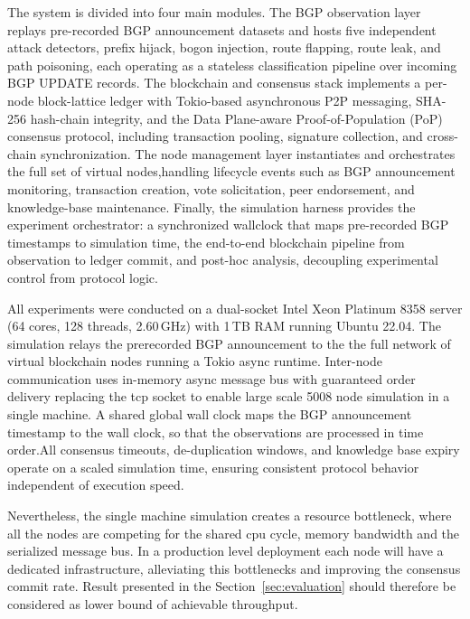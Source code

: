 \documentclass[conference]{IEEEtran}
\newcommand{\BfPara}[1]{\vspace{1mm}{\noindent\textbf{#1.}}\xspace}
\begin{document}
\BfPara{Prototype Architecture}
The system is divided into four main modules. The BGP observation layer replays pre-recorded BGP announcement datasets and hosts five independent attack detectors, prefix
hijack, bogon injection, route flapping, route leak, and path poisoning, each operating as a stateless classification pipeline over incoming BGP UPDATE records. The blockchain and consensus stack implements a per-node block-lattice ledger with Tokio-based asynchronous P2P messaging, SHA-256 hash-chain
integrity, and the Data Plane-aware Proof-of-Population (PoP) consensus protocol, including transaction pooling, signature collection, and cross-chain synchronization. The node management layer instantiates and orchestrates the full set of virtual nodes,handling lifecycle events such as BGP announcement monitoring, transaction creation, vote solicitation, peer endorsement,
and knowledge-base maintenance. Finally, the simulation harness provides the experiment orchestrator: a synchronized wallclock that maps pre-recorded BGP timestamps to simulation
time, the end-to-end blockchain pipeline from observation to ledger commit, and post-hoc analysis, decoupling experimental control from protocol logic.



\BfPara{Simulation environment}
All experiments were conducted on a dual-socket Intel Xeon Platinum 8358 server (64 cores, 128 threads, 2.60\,GHz) with 1\,TB RAM running Ubuntu 22.04. The simulation relays the prerecorded BGP announcement to the   the full network of virtual blockchain nodes running a Tokio async runtime. Inter-node communication uses in-memory async message bus with guaranteed order delivery  replacing the tcp socket to enable large scale 5008 node simulation in a single machine. A shared global wall clock maps the BGP announcement timestamp to the wall clock, so that the observations are processed in time order.All consensus timeouts, de-duplication windows, and knowledge base expiry operate on a scaled simulation time, ensuring consistent protocol behavior independent of execution speed.

Nevertheless, the single machine simulation creates a resource bottleneck, where all the nodes are competing for the shared cpu cycle, memory bandwidth and the serialized message bus. In a production level deployment each node will have a dedicated infrastructure, alleviating this bottlenecks and improving the consensus commit rate. Result presented in the Section~\ref{sec:evaluation} should therefore be considered as lower bound of achievable throughput.
\end{document}
